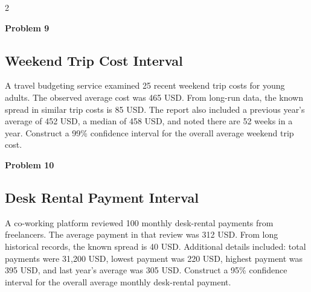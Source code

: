 \documentclass[12pt]{article}
\newcommand{\SubsectionBox}[1]{%
\noindent\colorbox{gray!30}{\parbox{\linewidth}{\textbf{#1}}}\par\vspace{0.35cm}%
}
\begin{document}
\begin{multicols}{2}
\vspace{0.5cm}
\SubsectionBox{Problem 9}
\subsection*{Weekend Trip Cost Interval}
A travel budgeting service examined 25 recent weekend trip costs for young adults.
		The observed average cost was 465 USD.
		From long-run data, the known spread in similar trip costs is 85 USD.
		The report also included a previous year's average of 452 USD, a median of 458 USD, and noted there are 52 weeks in a year.
		Construct a 99\% confidence interval for the overall average weekend trip cost.

\vspace{0.5cm}
\SubsectionBox{Problem 10}
\subsection*{Desk Rental Payment Interval}
A co-working platform reviewed 100 monthly desk-rental payments from freelancers.
		The average payment in that review was 312 USD.
		From long historical records, the known spread is 40 USD.
		Additional details included: total payments were 31{,}200 USD, lowest payment was 220 USD, highest payment was 395 USD, and last year's average was 305 USD.
		Construct a 95\% confidence interval for the overall average monthly desk-rental payment.

\end{multicols}
\end{document}
